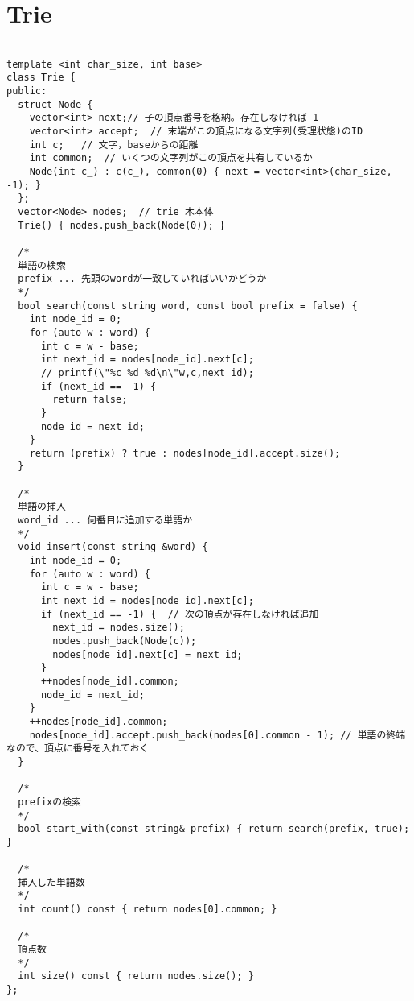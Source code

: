 \documentclass{jsarticle}
\begin{document}
\section{Trie}
\color{black}
\begin{lstlisting}[caption=Trie]

template <int char_size, int base>
class Trie {
public:
  struct Node {
    vector<int> next;// 子の頂点番号を格納。存在しなければ-1
    vector<int> accept;  // 末端がこの頂点になる文字列(受理状態)のID
    int c;   // 文字，baseからの距離
    int common;  // いくつの文字列がこの頂点を共有しているか
    Node(int c_) : c(c_), common(0) { next = vector<int>(char_size, -1); }
  };
  vector<Node> nodes;  // trie 木本体
  Trie() { nodes.push_back(Node(0)); }

  /*
  単語の検索
  prefix ... 先頭のwordが一致していればいいかどうか
  */
  bool search(const string word, const bool prefix = false) {
    int node_id = 0;
    for (auto w : word) {
      int c = w - base;
      int next_id = nodes[node_id].next[c];
      // printf(\"%c %d %d\n\"w,c,next_id);
      if (next_id == -1) {
        return false;
      }
      node_id = next_id;
    }
    return (prefix) ? true : nodes[node_id].accept.size();
  }

  /*
  単語の挿入
  word_id ... 何番目に追加する単語か
  */
  void insert(const string &word) {
    int node_id = 0;
    for (auto w : word) {
      int c = w - base;
      int next_id = nodes[node_id].next[c];
      if (next_id == -1) {  // 次の頂点が存在しなければ追加
        next_id = nodes.size();
        nodes.push_back(Node(c));
        nodes[node_id].next[c] = next_id;
      }
      ++nodes[node_id].common;
      node_id = next_id;
    }
    ++nodes[node_id].common;
    nodes[node_id].accept.push_back(nodes[0].common - 1); // 単語の終端なので、頂点に番号を入れておく
  }

  /*
  prefixの検索
  */
  bool start_with(const string& prefix) { return search(prefix, true); }

  /*
  挿入した単語数
  */
  int count() const { return nodes[0].common; }

  /*
  頂点数
  */
  int size() const { return nodes.size(); }
};

\end{lstlisting}

\color{white}
\end{document}
